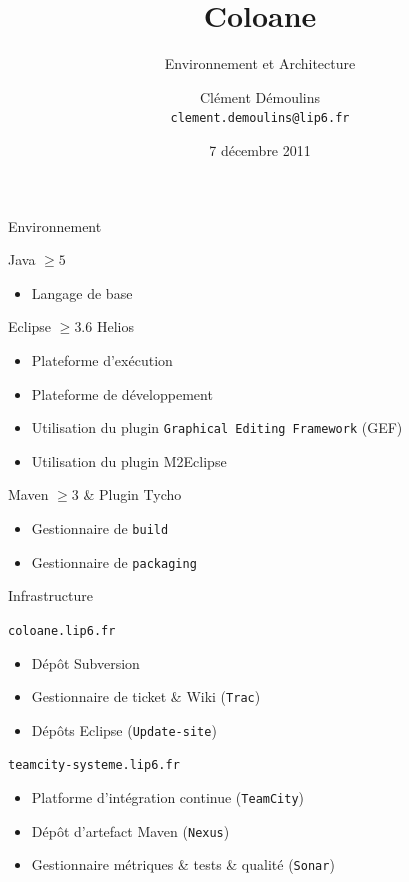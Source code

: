 \documentclass{beamer}
\title{Coloane}
\subtitle{Environnement et Architecture}
\author[Clément Démoulins]{Clément Démoulins \\ \texttt{clement.demoulins@lip6.fr}}
\institute{Lip6}
\date{7 décembre 2011}
\begin{document}
\frame{\titlepage}



\begin{frame}{Environnement}
\begin{block}{Java {\footnotesize $\geq 5$}}
\begin{itemize}
\item Langage de base
\end{itemize}
\end{block}
\begin{block}{Eclipse {\footnotesize $\geq 3.6$ Helios}}
\begin{itemize}
\item Plateforme d'exécution
\item Plateforme de développement
\item Utilisation du plugin \texttt{Graphical Editing Framework} (GEF)
\item Utilisation du plugin M2Eclipse
\end{itemize}
\end{block}
\begin{block}{Maven {\footnotesize $\geq 3$} \& Plugin Tycho}
\begin{itemize}
\item Gestionnaire de \texttt{build}
\item Gestionnaire de \texttt{packaging}
\end{itemize}
\end{block}
\end{frame}



\begin{frame}{Infrastructure}
\begin{exampleblock}{\texttt{coloane.lip6.fr}}
\begin{itemize}
\item Dépôt Subversion
\item Gestionnaire de ticket \& Wiki (\texttt{Trac})
\item Dépôts Eclipse (\texttt{Update-site})
\end{itemize}
\end{exampleblock}
\begin{exampleblock}{\texttt{teamcity-systeme.lip6.fr}}
\begin{itemize}
\item Platforme d'intégration continue (\texttt{TeamCity})
\item Dépôt d'artefact Maven (\texttt{Nexus})
\item Gestionnaire métriques \& tests \& qualité (\texttt{Sonar})
\end{itemize}
\end{exampleblock}
\end{frame}
\end{document}
